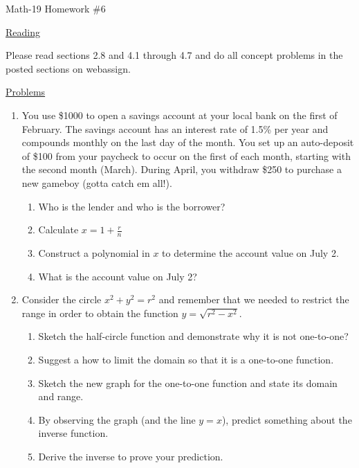 \documentclass[letterpaper,12pt,fleqn]{article}
\begin{document}
\begin{center}
\Large Math-19 Homework \#6
\end{center}

\vspace{0.5in}

\underline{Reading}

Please read sections 2.8 and 4.1 through 4.7 and do all concept problems in the
posted sections on web\-assign.

\underline{Problems}

\begin{enumerate}
\item You use \$1000 to open a savings account at your local bank on the first
of February. The savings account has an interest rate of 1.5\% per year and
compounds monthly on the last day of the month. You set up an auto-deposit of
\$100 from your paycheck to occur on the first of each month, starting with the
second month (March).  During April, you withdraw \$250 to purchase a new
gameboy (gotta catch em all!).
\begin{enumerate}
\item Who is the lender and who is the borrower?
\item Calculate $x=1+\frac{r}{n}$
\item Construct a polynomial in $x$ to determine the account value on July 2.
\item What is the account value on July 2?
\end{enumerate}

\item Consider the circle $x^2+y^2=r^2$ and remember that we needed to restrict
the range in order to obtain the function $y=\sqrt{r^2-x^2}$.
\begin{enumerate}
\item Sketch the half-circle function and demonstrate why it is not one-to-one?
\item Suggest a how to limit the domain so that it is a one-to-one function.
\item Sketch the new graph for the one-to-one function and state its domain and
range.
\item By observing the graph (and the line $y=x$), predict something about the
inverse function.
\item Derive the inverse to prove your prediction.
\end{enumerate}


\end{enumerate}
\end{document}
